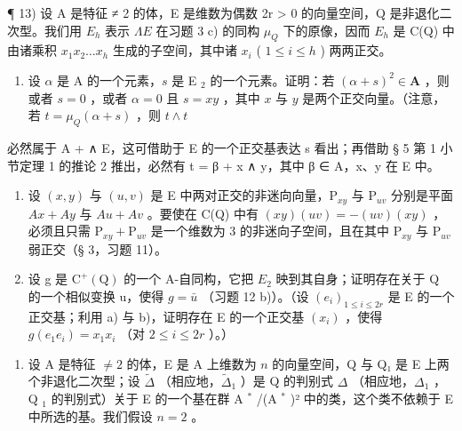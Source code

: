 ¶ 13) 设 A 是特征 ≠ 2 的体，E 是维数为偶数 2r \textgreater{} 0 的向量空间，Q 是非退化二次型。我们用 \(E_{h}\) 表示 \(\Lambda E\) 在习题 3 c) 的同构 \(\mu_{Q}\) 下的原像，因而 \(E_{h}\) 是 C(Q) 中由诸乘积 \(x_{1}x_{2}\ldots x_{h}\) 生成的子空间，其中诸 \(x_{i}\) ( \(1 \leqslant i \leqslant h\) ) 两两正交。

\begin{enumerate}
\def\labelenumi{\alph{enumi})}
\tightlist
\item
  设 \(\alpha\) 是 A 的一个元素，\(s\) 是 E \(_2\) 的一个元素。证明：若 \((\alpha + s)^2 \in \mathbf{A}\) ，则或者 \(s = 0\) ，或者 \(\alpha = 0\) 且 \(s = xy\) ，其中 \(x\) 与 \(y\) 是两个正交向量。（注意，若 \(t = \mu_Q(\alpha + s)\) ，则 \(t \wedge t\)
\end{enumerate}

必然属于 A + ∧ E，这可借助于 E 的一个正交基表达 s 看出；再借助 § 5 第 1 小节定理 1 的推论 2 推出，必然有 t = β + x ∧ y，其中 β ∈ A，x、y 在 E 中。

\begin{enumerate}
\def\labelenumi{\alph{enumi})}
\setcounter{enumi}{1}
\item
  设 \((x, y)\) 与 \((u, v)\) 是 E 中两对正交的非迷向向量，\(\mathrm{P}_{xy}\) 与 \(\mathrm{P}_{uv}\) 分别是平面 \(Ax + Ay\) 与 \(Au + Av\) 。要使在 C(Q) 中有 \((xy)(uv) = -(uv)(xy)\) ，必须且只需 \(\mathrm{P}_{xy} + \mathrm{P}_{uv}\) 是一个维数为 3 的非迷向子空间，且在其中 \(\mathrm{P}_{xy}\) 与 \(\mathrm{P}_{uv}\) 弱正交（§ 3，习题 11）。
\item
  设 g 是 \(\mathrm{C}^{+}(\mathrm{Q})\) 的一个 A-自同构，它把 \(E_{2}\) 映到其自身；证明存在关于 Q 的一个相似变换 u，使得 \(g = \bar{u}\) （习题 12 b)）。（设 \((e_{i})_{1 \leqslant i \leqslant 2r}\) 是 E 的一个正交基；利用 a) 与 b)，证明存在 E 的一个正交基 \((x_{i})\) ，使得 \(g(e_{1}e_{i}) = x_{1}x_{i}\) （对 \(2 \leqslant i \leqslant 2r\) ）。）
\end{enumerate}

\begin{enumerate}
\def\labelenumi{\arabic{enumi})}
\setcounter{enumi}{13}
\tightlist
\item
  设 A 是特征 \(\neq 2\) 的体，E 是 A 上维数为 \(n\) 的向量空间，Q 与 Q₁ 是 E 上两个非退化二次型；设 \(\tilde{\Delta}\) （相应地，\(\tilde{\Delta}_{1}\) ）是 Q 的判别式 \(\Delta\) （相应地，\(\Delta_{1}\) ，Q \(_{1}\) 的判别式）关于 E 的一个基在群 A \(^{*}\) /(A \(^{*}\) )² 中的类，这个类不依赖于 E 中所选的基。我们假设 \(n = 2\) 。
\end{enumerate}

